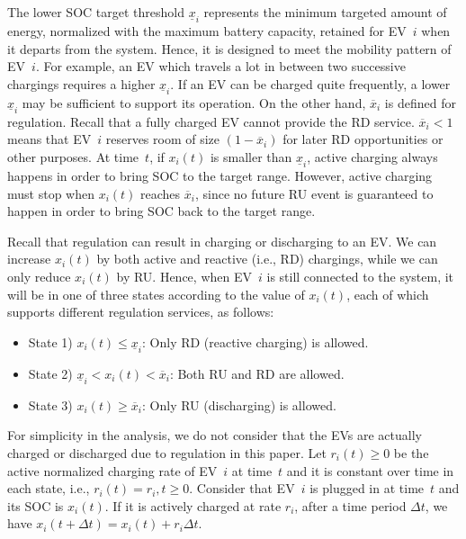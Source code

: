 \documentclass[journal]{IEEEtran}
\begin{document}
The lower SOC target threshold $\underline{x}_i$ represents the minimum
targeted amount of energy, normalized with the maximum battery capacity,
retained for EV~$i$ when it departs from the system.  Hence, it is designed to
meet the mobility pattern of EV~$i$.  For example, an EV which travels a lot in
between two successive chargings requires a higher $\underline{x}_i$.  If an EV
can be charged quite frequently, a lower $\underline{x}_i$ may be sufficient to
support its operation.  On the other hand, $\overline{x}_i$ is defined for
regulation.  Recall that a fully charged EV cannot provide the RD
service.  $\overline{x}_i<1$ means that EV~$i$ reserves room of size
$(1 - \overline{x}_i)$ for later RD opportunities or other
purposes.  At time~$t$, if $x_i(t)$ is smaller than $\underline{x}_i$, active
charging always happens in order to bring SOC to the target range.  However,
active charging must stop when $x_i(t)$ reaches $\overline{x}_i$, since no
future RU event is guaranteed to happen in order to bring SOC back
to the target range.
 
Recall that regulation can result in charging or discharging to an EV.  We can
increase $x_i(t)$ by both active and reactive (i.e., RD)
chargings, while we can only reduce $x_i(t)$ by RU.  Hence, when
EV~$i$ is still connected to the system, it will be in one of three states
according to the value of $x_i(t)$, each of which supports different 
regulation services, as follows:
\begin{itemize}[]
\item State 1) $x_i(t) \leq \underline{x}_i$:
Only RD (reactive charging) is allowed.

\item State 2) $\underline{x}_i< x_i(t) < \overline{x}_i$:
Both RU and RD are allowed.

\item State 3) $x_i(t)\geq \overline{x}_i$:
Only RU (discharging) is allowed. 
\end{itemize} 

For simplicity in the analysis, we do not consider that the EVs are actually
charged or discharged due to regulation in this paper.  
Let $r_i(t) \geq 0$ be
the active normalized charging rate of EV~$i$ at time~$t$ and it is constant
over time in each state, i.e., $r_i(t) = r_i, t \geq 0$.
Consider that EV~$i$ is plugged in
at time~$t$ and its SOC is $x_i(t)$.  If it is actively charged at rate $r_i$,
after a time period $\Delta t$, we have
$x_i(t+\Delta t) = x_i(t) + r_i \Delta t$.
\end{document}
